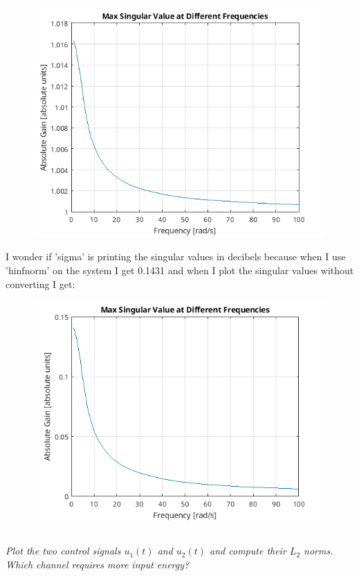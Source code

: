 \documentclass[12pt, letterpaper]{article}
\begin{document}
\begin{figure}[H]
    \centering
    \includegraphics{maxSVhinf.png}
\end{figure}

I wonder if 'sigma' is printing the singular values in decibels because when I use 'hinfnorm' on the system I get 0.1431 and when I plot the singular values without converting I get:

\begin{figure}[H]
    \centering
    \includegraphics{maxSVhinfDB.png}
\end{figure}


\subsection{}
\textit{
Plot the two control signals $u_1(t)$ and $u_2(t)$ and compute their $L_2$ norms. Which channel requires more input energy?
}
\end{document}

